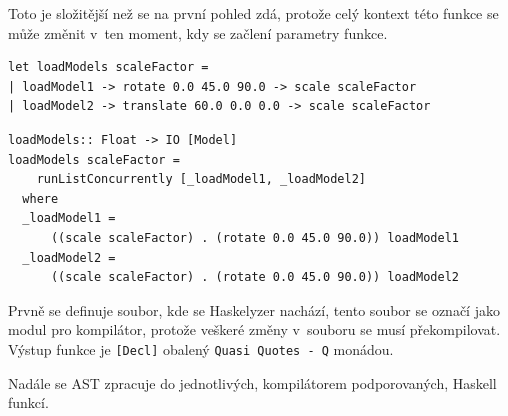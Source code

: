 \documentclass[male, czech]{kithesis}
\newenvironment{code}{\captionsetup{type=listing}}{}
\newcommand{\haskellInline}[1]{\colorbox{gray!10}{\texttt{#1}}}
\begin{document}
Toto je složitější než se na první pohled zdá,
protože celý kontext této funkce se může změnit v~ten moment,
kdy se začlení parametry funkce.

\begin{code}
\begin{verbatim}
let loadModels scaleFactor =
| loadModel1 -> rotate 0.0 45.0 90.0 -> scale scaleFactor 
| loadModel2 -> translate 60.0 0.0 0.0 -> scale scaleFactor 
\end{verbatim}
\end{code}

\begin{code}
\begin{verbatim}
loadModels:: Float -> IO [Model]
loadModels scaleFactor = 
    runListConcurrently [_loadModel1, _loadModel2] 
  where 
  _loadModel1 = 
      ((scale scaleFactor) . (rotate 0.0 45.0 90.0)) loadModel1 
  _loadModel2 = 
      ((scale scaleFactor) . (rotate 0.0 45.0 90.0)) loadModel2 
\end{verbatim}
\end{code}

Prvně se definuje soubor, 
kde se Haskelyzer nachází,
tento soubor se označí jako modul pro kompilátor,
protože veškeré změny v~souboru se musí překompilovat. 
Výstup funkce je \haskellInline{[Decl]} obalený 
\haskellInline{Quasi Quotes - Q} monádou.

Nadále se AST zpracuje do jednotlivých, 
kompilátorem podporovaných, 
Haskell funkcí.
\end{document}
